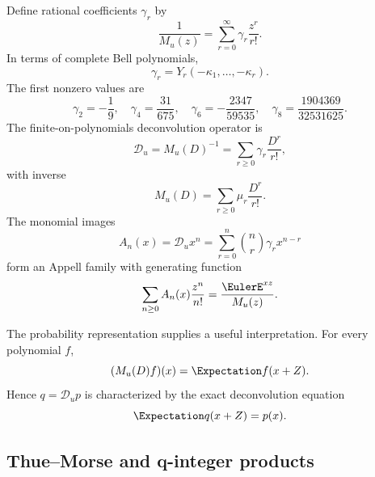 \documentclass[11pt,oneside]{article}
\numberwithin{equation}{section}
\theoremstyle{definition}
\theoremstyle{remark}
\newcommand{\M}{M_u}
\newcommand{\Dscr}{\mathscr D_u}
\begin{document}
Define rational coefficients $\gamma_r$ by
\begin{equation}
 \frac1{\M(z)}=\sum_{r=0}^{\infty}\gamma_r\frac{z^r}{r!}.
 \label{eq:gamma-def}
\end{equation}
In terms of complete Bell polynomials,
\begin{equation}
 \gamma_r=Y_r(-\kappa_1,\ldots,-\kappa_r).
 \label{eq:gamma-bell}
\end{equation}
The first nonzero values are
\begin{equation}
 \gamma_2=-\frac19,\quad
 \gamma_4=\frac{31}{675},\quad
 \gamma_6=-\frac{2347}{59535},\quad
 \gamma_8=\frac{1904369}{32531625}.
 \label{eq:gamma-values}
\end{equation}
The finite-on-polynomials deconvolution operator is
\begin{equation}
 \Dscr=\M(D)^{-1}=\sum_{r\ge0}\gamma_r\frac{D^r}{r!},
 \label{eq:deconvolution}
\end{equation}
with inverse
\begin{equation}
 \M(D)=\sum_{r\ge0}\mu_r\frac{D^r}{r!}.
 \label{eq:moment-operator}
\end{equation}
The monomial images
\begin{equation}
 A_n(x)=\Dscr x^n=\sum_{r=0}^{n}\binom nr\gamma_r x^{n-r}
 \label{eq:appell-polys}
\end{equation}
form an Appell family with generating function
\begin{equation}
 \sum_{n\ge0}A_n(x)\frac{z^n}{n!}=\frac{\EulerE^{xz}}{\M(z)}.
 \label{eq:appell-egf}
\end{equation}

The probability representation supplies a useful interpretation.  For every
polynomial $f$,
\begin{equation}
 (\M(D)f)(x)=\Expectation f(x+Z).
 \label{eq:translation-expectation}
\end{equation}
Hence $q=\Dscr p$ is characterized by the exact deconvolution equation
\begin{equation}
 \Expectation q(x+Z)=p(x).
 \label{eq:prob-deconv}
\end{equation}

\subsection{Thue--Morse and q-integer products}
\end{document}
